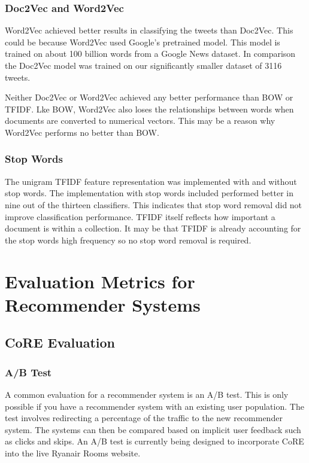 \subsubsection*{Doc2Vec and Word2Vec}

Word2Vec achieved better results in classifying the tweets than Doc2Vec. This could be because Word2Vec used Google's pretrained model. This model is trained on about 100 billion words from a Google News dataset. In comparison the Doc2Vec model was trained on our significantly smaller dataset of 3116 tweets.

Neither Doc2Vec or Word2Vec achieved any better performance than BOW or TFIDF. Lke BOW, Word2Vec also loses the relationships between words when documents are converted to numerical vectors. This may be a reason why Word2Vec performs no better than BOW.

\subsubsection*{Stop Words}

The unigram TFIDF feature representation was implemented with and without stop words. The implementation with stop words included performed better in nine out of the thirteen classifiers. This indicates that stop word removal did not improve classification performance. TFIDF itself reflects how important a document is within a collection. It may be that TFIDF is already accounting for the stop words high frequency so no stop word removal is required.

\section{Evaluation Metrics for Recommender Systems}

\subsection*{CoRE Evaluation}

\subsubsection*{A/B Test}

A common evaluation for a recommender system is an A/B test. This is only possible if you have a recommender system with an existing user population. The test involves redirecting a percentage of the traffic to the new recommender system. The systems can then be compared based on implicit user feedback such as clicks and skips. An A/B test is currently being designed to incorporate CoRE into the live Ryanair Rooms website.

